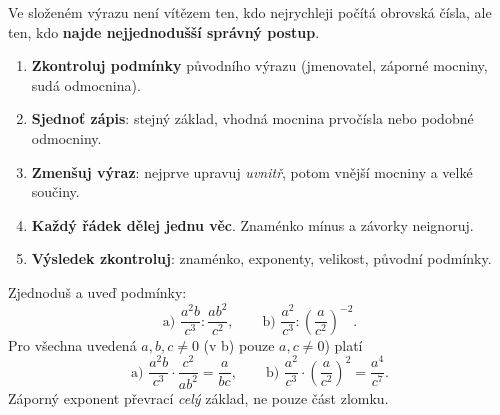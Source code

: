 \documentclass[11pt,a4paper]{article}
\begin{document}

Ve složeném výrazu není vítězem ten, kdo nejrychleji počítá obrovská čísla,
ale ten, kdo \textbf{najde nejjednodušší správný postup}.
\begin{definiceBox}[title={Postup - Kontrola složeného výrazu}]
\begin{enumerate}[label=\arabic*)]
\item \textbf{Zkontroluj podmínky} původního výrazu (jmenovatel, záporné mocniny, sudá odmocnina).
\item \textbf{Sjednoť zápis}: stejný základ, vhodná mocnina prvočísla nebo podobné odmocniny.
\item \textbf{Zmenšuj výraz}: nejprve upravuj \emph{uvnitř}, potom vnější mocniny a velké součiny.
\item \textbf{Každý řádek dělej jednu věc}. Znaménko mínus a závorky neignoruj.
\item \textbf{Výsledek zkontroluj}: znaménko, exponenty, velikost, původní podmínky.
\end{enumerate}
\end{definiceBox}

\begin{prikladReseniBox}[title={Příklad 1},breakable=false]
Zjednoduš a uveď podmínky:
\[
\text{a) }\frac{a^2b}{c^3}:\frac{ab^2}{c^2},\qquad
\text{b) }\frac{a^2}{c^3}:\left(\frac a{c^2}\right)^{-2}.
\]
\tcblower
Pro všechna uvedená $a,b,c\ne0$ (v b) pouze $a,c\ne0$) platí
\[
\text{a) }\frac{a^2b}{c^3}\cdot\frac{c^2}{ab^2}=\boxed{\frac a{bc}},
\qquad
\text{b) }\frac{a^2}{c^3}\cdot\left(\frac a{c^2}\right)^2
=\boxed{\frac{a^4}{c^7}}.
\]
Záporný exponent převrací \emph{celý} základ, ne pouze část zlomku.
\end{prikladReseniBox}
\end{document}
